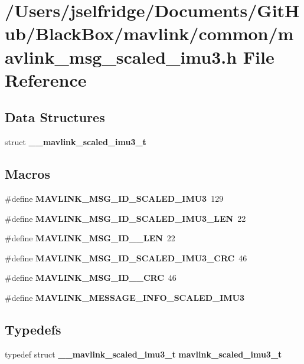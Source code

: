 \section{/\+Users/jselfridge/\+Documents/\+Git\+Hub/\+Black\+Box/mavlink/common/mavlink\+\_\+msg\+\_\+scaled\+\_\+imu3.h File Reference}
\label{mavlink__msg__scaled__imu3_8h}
\subsection*{Data Structures}
\begin{DoxyCompactItemize}
\item 
struct \textbf{ \+\_\+\+\_\+mavlink\+\_\+scaled\+\_\+imu3\+\_\+t}
\end{DoxyCompactItemize}
\subsection*{Macros}
\begin{DoxyCompactItemize}
\item 
\#define \textbf{ M\+A\+V\+L\+I\+N\+K\+\_\+\+M\+S\+G\+\_\+\+I\+D\+\_\+\+S\+C\+A\+L\+E\+D\+\_\+\+I\+M\+U3}~129
\item 
\#define \textbf{ M\+A\+V\+L\+I\+N\+K\+\_\+\+M\+S\+G\+\_\+\+I\+D\+\_\+\+S\+C\+A\+L\+E\+D\+\_\+\+I\+M\+U3\+\_\+\+L\+EN}~22
\item 
\#define \textbf{ M\+A\+V\+L\+I\+N\+K\+\_\+\+M\+S\+G\+\_\+\+I\+D\+\_\+\_\+\+L\+EN}~22
\item 
\#define \textbf{ M\+A\+V\+L\+I\+N\+K\+\_\+\+M\+S\+G\+\_\+\+I\+D\+\_\+\+S\+C\+A\+L\+E\+D\+\_\+\+I\+M\+U3\+\_\+\+C\+RC}~46
\item 
\#define \textbf{ M\+A\+V\+L\+I\+N\+K\+\_\+\+M\+S\+G\+\_\+\+I\+D\+\_\+\_\+\+C\+RC}~46
\item 
\#define \textbf{ M\+A\+V\+L\+I\+N\+K\+\_\+\+M\+E\+S\+S\+A\+G\+E\+\_\+\+I\+N\+F\+O\+\_\+\+S\+C\+A\+L\+E\+D\+\_\+\+I\+M\+U3}
\end{DoxyCompactItemize}
\subsection*{Typedefs}
\begin{DoxyCompactItemize}
\item 
typedef struct \textbf{ \+\_\+\+\_\+mavlink\+\_\+scaled\+\_\+imu3\+\_\+t} \textbf{ mavlink\+\_\+scaled\+\_\+imu3\+\_\+t}
\end{DoxyCompactItemize}


